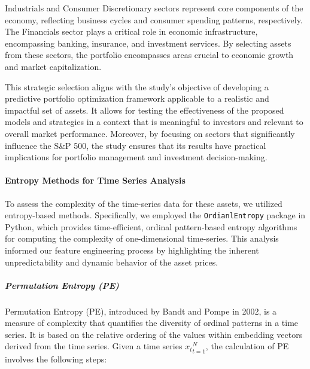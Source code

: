 Industrials and Consumer Discretionary sectors represent core components of the economy, reflecting business cycles and consumer spending patterns, respectively. The Financials sector plays a critical role in economic infrastructure, encompassing banking, insurance, and investment services. By selecting assets from these sectors, the portfolio encompasses areas crucial to economic growth and market capitalization.

This strategic selection aligns with the study's objective of developing a predictive portfolio optimization framework applicable to a realistic and impactful set of assets. It allows for testing the effectiveness of the proposed models and strategies in a context that is meaningful to investors and relevant to overall market performance. Moreover, by focusing on sectors that significantly influence the S\&P 500, the study ensures that its results have practical implications for portfolio management and investment decision-making.

\paragraph{Entropy Methods for Time Series Analysis}
To assess the complexity of the time-series data for these assets, we utilized entropy-based methods. Specifically, we employed the \texttt{OrdianlEntropy} package in Python, which provides time-efficient, ordinal pattern-based entropy algorithms for computing the complexity of one-dimensional time-series. This analysis informed our feature engineering process by highlighting the inherent unpredictability and dynamic behavior of the asset prices.

\subparagraph{Permutation Entropy (PE)}
Permutation Entropy (PE), introduced by Bandt and Pompe in 2002, is a measure of complexity that quantifies the diversity of ordinal patterns in a time series. It is based on the relative ordering of the values within embedding vectors derived from the time series.
Given a time series ${ x_t }_{t=1}^N$, the calculation of PE involves the following steps:


